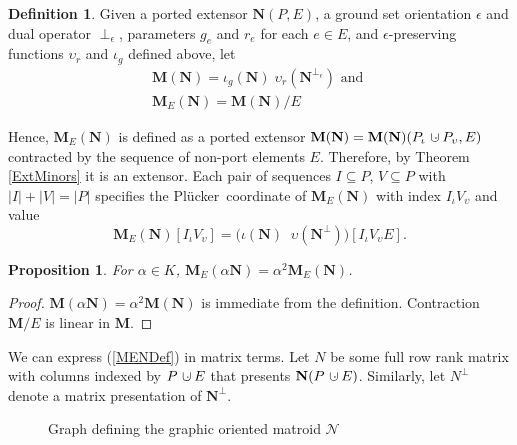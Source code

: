 \documentclass[12pt]{article}
\newtheorem{proposition}[theorem]{Proposition}
\theoremstyle{definition}
\newtheorem{definition}[theorem]{Definition}
\newcommand{\dunion}
{\mbox{\hbox{\hskip6pt$\cdot$\hskip-5.50pt$\cup$\hskip2pt}}}
\newcommand{\epsilonfun}{\ensuremath{\epsilon}}
\newcommand{\Is}{\ensuremath{\iota}}
\newcommand{\Vs}{\ensuremath{\upsilon}}
\newcommand{\FieldK}{\ensuremath{K}}
\newcommand{\ext}[1]{\ensuremath{\mathbf{#1}}}
\newcommand{\Plucker}{Pl\"{u}cker\ }
\begin{document}
\begin{definition}
\label{DefM}
Given 
a ported extensor \(\ext{N}(P,E)\),
a ground set orientation \(\epsilonfun\) and dual operator
$\perp_\epsilon$,
parameters \(g_e\) and \(r_e\) for each 
\(e\in E\), and 
\(\epsilonfun\)-preserving functions $\Vs_r$ and $\Is_g$ defined 
above, let
\begin{equation}
\begin{split}
\label{MENDef}
\ext{M}(\ext{N}) = \Is_{g}(\ext{N})\;\Vs_{r}(\ext{N}^{\perp_\epsilon})
\text{ and }\\
\ext{M}_E(\ext{N}) =
 \ext{M}(\ext{N})/E
\end{split}
\end{equation}
\end{definition}

Hence, $\ext{M}_E(\ext{N})$ is defined as a ported extensor
$\ext{M}(\ext{N})=\ext{M}(\ext{N})(P_\Is\dunion P_\Vs,E)$ 
contracted by the sequence 
of non-port elements $E$.  Therefore, 
by Theorem \ref{ExtMinors}
it is an extensor.  
Each pair of sequences
$I\subseteq P$, $V\subseteq P$ with $|I|+|V|=|P|$
specifies the \Plucker coordinate
of $\ext{M}_E(\ext{N})$ 
with index $I_\Is V_\Vs$ and value 
\begin{equation}
\label{MENComponentDef}
\ext{M}_E(\ext{N})[I_{\Is}V_{\Vs}] 
      = \big(\Is(\ext{N})\;\;\Vs(\ext{N}^\perp)\big)[I_{\Is}V_{\Vs}E].
\end{equation}

\begin{proposition} 
\label{PropostionAlphaSquared}
For $\alpha\in\FieldK$, 
$\ext{M}_E(\alpha \ext{N}) = \alpha^2 \ext{M}_E(\ext{N})$.
\end{proposition}
\begin{proof} 
$\ext{M}(\alpha \ext{N}) = \alpha^2 \ext{M}(\ext{N})$ is immediate
from the definition. Contraction $\ext{M}/E$ is linear in 
$\ext{M}$.
\end{proof}



We can express  (\ref{MENDef}) in matrix terms.
Let $N$ be some full row rank matrix with columns indexed
by $P\dunion E$ that presents $\ext{N}(P\dunion E)$.
Similarly, let $N^{\perp}$ denote a matrix presentation
of $\ext{N}^{\perp}$.

\begin{figure}
\begin{center}\end{center}
\caption{Graph defining the graphic oriented matroid $\mathcal{N}$}
\label{K4figure}
\end{figure}
\end{document}
